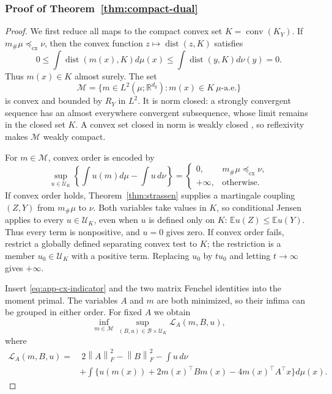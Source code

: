 \documentclass[11pt]{article}
\newcommand{\R}{\mathbb R}
\newcommand{\E}{\mathbb E}
\newcommand{\cU}{\mathcal U}
\newcommand{\cM}{\mathcal M}
\newcommand{\norm}[1]{\left\lVert #1\right\rVert}
\newcommand{\cx}{\preceq_{\mathrm{cx}}}
\theoremstyle{plain}
\theoremstyle{definition}
\theoremstyle{remark}
\begin{document}
\subsubsection{Proof of Theorem~\ref{thm:compact-dual}}\label{proof:7.1}

\begin{proof}
We first reduce all maps to the compact convex set $K=\operatorname{conv}(K_Y)$.
If $m_\#\mu\cx\nu$, then the convex function
$z\mapsto\operatorname{dist}(z,K)$ satisfies
\[
 0\le\int\operatorname{dist}(m(x),K)d\mu(x)
 \le\int\operatorname{dist}(y,K)d\nu(y)=0.
\]
Thus $m(x)\in K$ almost surely.  The set
\[
 \cM=\{m\in L^2(\mu;\R^{d_y}):m(x)\in K\ \mu\text{-a.e.}\}
\]
is convex and bounded by $R_Y$ in $L^2$.  It is norm closed: a strongly
convergent sequence has an almost everywhere convergent subsequence, whose limit
remains in the closed set $K$. A convex set closed in norm is weakly closed
\cite[Theorem~3.7]{BrezisFA}, so
reflexivity makes $\cM$ weakly compact.

For $m\in\cM$, convex order is encoded by
\begin{equation}\label{eq:app-cx-indicator}
 \sup_{u\in\cU_K}\left\{\int u(m)d\mu-\int u\,d\nu\right\}
 =\begin{cases}
 0,&m_\#\mu\cx\nu,\\
 +\infty,&\text{otherwise}.
 \end{cases}
\end{equation}
If convex order holds, Theorem~\ref{thm:strassen} supplies a martingale coupling
$(Z,Y)$ from $m_\#\mu$ to $\nu$. Both variables take values in $K$, so conditional
Jensen applies to every $u\in\cU_K$, even when $u$ is defined only on $K$:
\(\E u(Z)\le\E u(Y)\). Thus every term is nonpositive, and $u=0$ gives zero.
If convex order fails, restrict a globally defined separating convex test to $K$;
the restriction is a member $u_0\in\cU_K$ with a positive term. Replacing $u_0$
by $t u_0$ and letting $t\to\infty$ gives $+\infty$.

Insert \eqref{eq:app-cx-indicator} and the two matrix Fenchel identities into the
moment primal.  The variables $A$ and $m$ are both minimized, so their infima can
be grouped in either order.  For fixed $A$ we obtain
\[
 \inf_{m\in\cM}\sup_{(B,u)\in\mathcal B\times\cU_K}
 \mathcal L_A(m,B,u),
\]
where
\begin{align*}
 \mathcal L_A(m,B,u)
 =&\ 2\norm A_F^2-\norm B_F^2-\int u\,d\nu\\
 &+\int\{u(m(x))+2m(x)^\top Bm(x)-4m(x)^\top A^\top x\}d\mu(x).
\end{align*}


\end{proof}
\end{document}
